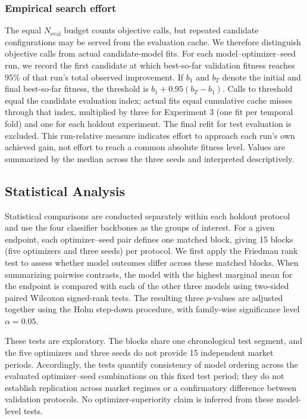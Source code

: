 \subsubsection{Empirical search effort}
\label{sec:empirical_effort}
The equal $N_{\mathrm{eval}}$ budget counts objective calls, but repeated candidate configurations may be served from the evaluation cache. We therefore distinguish objective calls from actual candidate-model fits. For each model--optimizer--seed run, we record the first candidate at which best-so-far validation fitness reaches 95\% of that run's total observed improvement. If $b_1$ and $b_T$ denote the initial and final best-so-far fitness, the threshold is $b_1+0.95(b_T-b_1)$. Calls to threshold equal the candidate evaluation index; actual fits equal cumulative cache misses through that index, multiplied by three for Experiment 3 (one fit per temporal fold) and one for each holdout experiment. The final refit for test evaluation is excluded. This run-relative measure indicates effort to approach each run's own achieved gain, not effort to reach a common absolute fitness level. Values are summarized by the median across the three seeds and interpreted descriptively.

\subsection{Statistical Analysis}
\label{sec:statistical_analysis}

Statistical comparisons are conducted separately within each holdout protocol and use the four classifier backbones as the groups of interest. For a given endpoint, each optimizer--seed pair defines one matched block, giving 15 blocks (five optimizers and three seeds) per protocol. We first apply the Friedman rank test to assess whether model outcomes differ across these matched blocks. When summarizing pairwise contrasts, the model with the highest marginal mean for the endpoint is compared with each of the other three models using two-sided paired Wilcoxon signed-rank tests. The resulting three $p$-values are adjusted together using the Holm step-down procedure, with family-wise significance level $\alpha=0.05$.

These tests are exploratory. The blocks share one chronological test segment, and the five optimizers and three seeds do not provide 15 independent market periods. Accordingly, the tests quantify consistency of model ordering across the evaluated optimizer--seed combinations on this fixed test period; they do not establish replication across market regimes or a confirmatory difference between validation protocols. No optimizer-superiority claim is inferred from these model-level tests.
